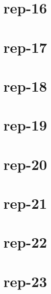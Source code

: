 \section*{rep-16}

\section*{rep-17}

\section*{rep-18}

\section*{rep-19}

\section*{rep-20}

\section*{rep-21}

\section*{rep-22}

\section*{rep-23}


